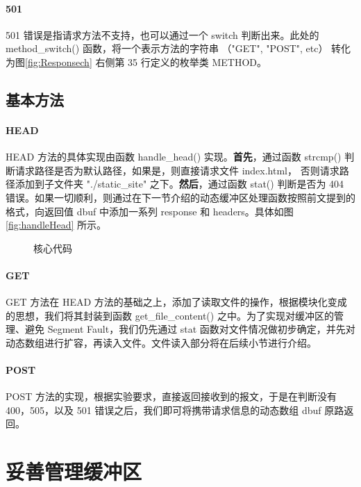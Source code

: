 \paragraph*{501}

501 错误是指请求方法不支持，也可以通过一个 switch 判断出来。此处的 method\_switch() 函数，将一个表示方法的字符串 （"GET", "POST", etc） 转化为图\ref{fig:Responsech} 右侧第 35 行定义的枚举类 METHOD。


\subsection{基本方法}

\paragraph*{HEAD} HEAD 方法的具体实现由函数 handle\_head() 实现。\textbf{首先}，通过函数 strcmp() 判断请求路径是否为默认路径，如果是，则直接请求文件 index.html， 否则请求路径添加到子文件夹 "./static\_site" 之下。\textbf{然后}，通过函数 stat() 判断是否为 404 错误。如果一切顺利，则通过在下一节介绍的动态缓冲区处理函数按照前文提到的格式，向返回值 dbuf 中添加一系列 response 和 headers。具体如图\ref{fig:handleHead} 所示。


\begin{figure}[htbp!]
    \centering
    \caption{核心代码}\label{fig:Main}
\end{figure}

\paragraph*{GET} GET 方法在 HEAD 方法的基础之上，添加了读取文件的操作，根据模块化变成的思想，我们将其封装到函数 get\_file\_content() 之中。为了实现对缓冲区的管理、避免 Segment Fault，我们仍先通过 stat 函数对文件情况做初步确定，并先对动态数组进行扩容，再读入文件。文件读入部分将在后续小节进行介绍。

\paragraph*{POST} POST 方法的实现，根据实验要求，直接返回接收到的报文，于是在判断没有 400，505，以及 501 错误之后，我们即可将携带请求信息的动态数组 dbuf 原路返回。

\section{妥善管理缓冲区}

